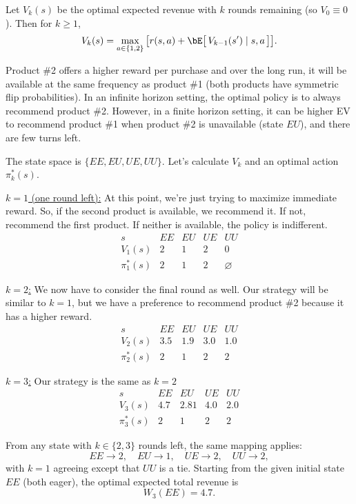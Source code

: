 \documentclass[12pt]{article}
\begin{document}
\medskip
\noindent{}
Let $V_k(s)$ be the optimal expected revenue with $k$ rounds remaining (so $V_0\equiv 0$). Then for $k\ge 1$,
\[
		V_k(s)=\max_{a\in\{1,2\}}\big[r(s,a)+\bE\big[\,V_{k-1}(s')\mid s,a\,\big]\big].
\]

\noindent{} Product \#2 offers a higher reward per purchase and over the long run,
it will be available at the same frequency as product \#1 (both products have symmetric flip probabilities).
In an infinite horizon setting, the optimal policy is to always recommend product \#2.
However, in a finite horizon setting, it can be higher EV to recommend product \#1 when product \#2 is
unavailable (state $EU$), and there are few turns left.

\medskip
\noindent{} The state space is $\{EE,EU,UE,UU\}$.
Let's calculate $V_k$ and an optimal action $\pi_k^\ast(s)$.

\medskip
\noindent\underline{$k=1$ (one round left):}
At this point, we're just trying to maximize immediate reward. So, if the second product is available,
we recommend it. If not, recommend the first product. If neither is available, the policy is indifferent.
\[
		\begin{array}{c|cccc}
				s & EE & EU & UE & UU\\\hline
				V_1(s) & 2 & 1 & 2 & 0\\
				\pi_1^\ast(s) & 2 & 1 & 2 & \varnothing
		\end{array}
\]

\medskip
\noindent\underline{$k=2$:}
We now have to consider the final round as well. Our strategy will be similar to $k=1$, but we have a
preference to recommend product \#2 because it has a higher reward.
\[
		\begin{array}{c|cccc}
				s & EE & EU & UE & UU\\\hline
				V_2(s) & 3.5 & 1.9 & 3.0 & 1.0\\
				\pi_2^\ast(s) & 2 & 1 & 2 & 2
		\end{array}
\]

\medskip
\noindent\underline{$k=3$:}
Our strategy is the same as $k=2$
\[
		\begin{array}{c|cccc}
				s & EE & EU & UE & UU\\\hline
				V_3(s) & 4.7 & 2.81 & 4.0 & 2.0 \\
				\pi_3^\ast(s) & 2 & 1 & 2 & 2
		\end{array}
\]

\medskip
\noindent{}
From any state with $k\in\{2,3\}$ rounds left, the same mapping applies:
\[
		EE\to 2,\quad EU\to 1,\quad UE\to 2,\quad UU\to 2,
\]
with $k=1$ agreeing except that $UU$ is a tie. Starting from the given initial state $EE$ (both eager), the optimal expected total revenue is
\[
		W_3(EE)=\boxed{4.7}.
\]
\newpage
\end{document}
